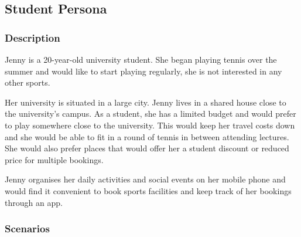 \subsection{Student Persona}
\label{sub:student_persona}


\subsubsection*{Description}
\label{ssub:student_description}

Jenny is a 20-year-old university student. She began playing tennis
over the summer and would like to start playing regularly, she is not
interested in any other sports.

Her university is situated in a large city. Jenny lives in a shared
house close to the university’s campus. As a student, she has a limited
budget and would prefer to play somewhere close to the university. This
would keep her travel costs down and she would be able to fit in a
round of tennis in between attending lectures. She would also prefer
places that would offer her a student discount or reduced price for
multiple bookings.

Jenny organises her daily activities and social events on her mobile
phone and would find it convenient to book sports facilities and keep
track of her bookings through an app.


\subsubsection*{Scenarios}
\label{ssub:student_scenarios}

